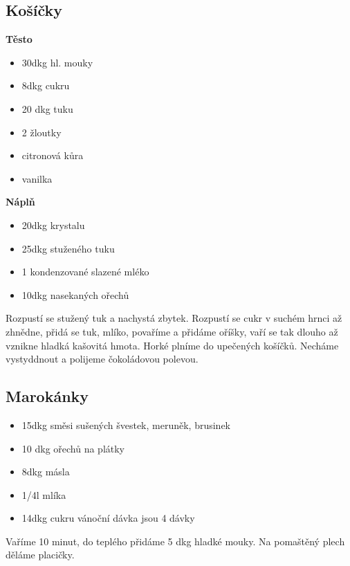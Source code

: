 \documentclass[10pt,a4paper]{article}
\newenvironment{myitemize}
{ \begin{itemize}
    \setlength{\itemsep}{0pt}
    \setlength{\parskip}{0pt}
    \setlength{\parsep}{0pt}     }
{ \end{itemize}                  }
\begin{document}
\subsection{Košíčky}
\begin{minipage}[t]{0,5\textwidth}
\textbf{Těsto}
\begin{myitemize} 
\item 30dkg hl. mouky
\item 8dkg cukru
\item 20 dkg tuku
\item 2 žloutky
\item citronová kůra
\item vanilka
\end{myitemize}

\end{minipage}
\begin{minipage}[t]{0,5\textwidth}
\textbf{Náplň}
\begin{myitemize} 
\item 20dkg krystalu
\item 25dkg stuženého tuku
\item 1 kondenzované slazené mléko
\item 10dkg  nasekaných ořechů
\end{myitemize}
Rozpustí se stužený tuk a nachystá zbytek.
Rozpustí se cukr v suchém hrnci až zhnědne, přidá se tuk, mlíko, povaříme a přidáme oříšky, vaří se tak dlouho až vznikne hladká kašovitá hmota. Horké plníme do upečených košíčků. Necháme vystyddnout a polijeme čokoládovou polevou.
\end{minipage}
\subsection{Marokánky}
\begin{minipage}[t]{0,5\textwidth}
\begin{myitemize} 
\item 15dkg směsi sušených švestek, meruněk, brusinek
\item 10 dkg ořechů na plátky
\item 8dkg másla
\item 1/4l mlíka
\item 14dkg cukru
vánoční dávka jsou 4 dávky
\end{myitemize}
\end{minipage}
\begin{minipage}[t]{0,5\textwidth}
Vaříme 10 minut, do teplého přidáme 5 dkg hladké mouky. Na pomaštěný plech děláme placičky.
\end{minipage}
\end{document}
